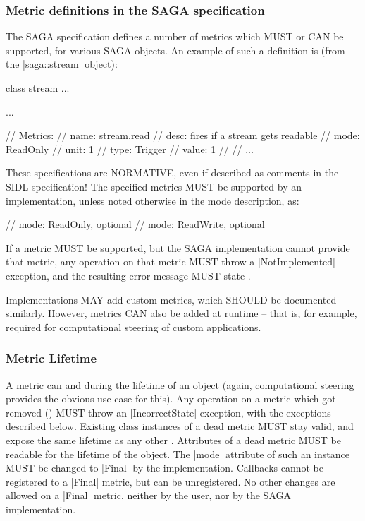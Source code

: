  
    \subsubsection*{Metric definitions in the SAGA
    specification}
 
    The SAGA specification defines a number of metrics which
    MUST or CAN be supported, for various SAGA objects.  An
    example of such a definition is (from the
    |saga::stream| object):
 
 \newpage
 
 \begin{myspectxt}
        class stream ...
        {
          ...
 
          // Metrics:
          //   name:  stream.read
          //   desc:  fires if a stream gets readable
          //   mode:  ReadOnly
          //   unit:  1
          //   type:  Trigger
          //   value: 1
          //
          //   ...
        }
 \end{myspectxt}
 
    These specifications are NORMATIVE, even if described as
    comments in the SIDL specification!  The specified metrics
    MUST be supported by an implementation, unless noted
    otherwise in the mode description, as:
 
 \begin{myspectxt}
          //   mode:  ReadOnly, optional
          //   mode:  ReadWrite, optional
 \end{myspectxt}
 
    If a metric MUST be supported, but the SAGA implementation
    cannot provide that metric, any operation on that metric
    MUST throw a |NotImplemented| exception, and the resulting
    error message MUST state .
 
    Implementations MAY add custom metrics, which SHOULD be
    documented similarly.  However, metrics CAN also be added at
    runtime -- that is, for example, required for computational
    steering of custom applications.
 
    
    \subsubsection*{Metric Lifetime}
 
    A metric can  and  during the lifetime
    of an object (again, computational steering provides the
    obvious use case for this).  Any operation on a metric which
    got removed () MUST throw an |IncorrectState|
    exception, with the exceptions described below.
    Existing class instances of a dead metric MUST stay valid,
    and expose the same lifetime as any other .  Attributes of a dead metric MUST be readable for
    the lifetime of the object.  The |mode| attribute of such an
    instance MUST be changed to |Final| by the implementation.
    Callbacks cannot be registered to a |Final| metric,
    but can be unregistered.  No other changes are allowed on a
    |Final| metric, neither by the user, nor by the SAGA
    implementation.  
 
